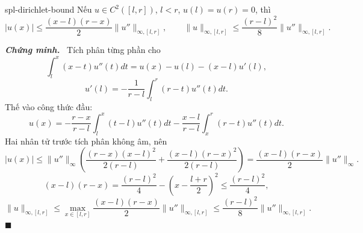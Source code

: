 \documentclass[12pt,a4paper,oneside]{book}
\numberwithin{algorithm}{chapter}
\theoremstyle{definition}
\newenvironment{chungminh}{\par\medskip\noindent\textbf{\textit{\color{mainblue}Chứng minh.}}\ }{\hfill$\blacksquare$\par\medskip}
\begin{document}
\begin{bode}{}{spl-dirichlet-bound}
Nếu $u\in C^2([l,r])$, $l<r$, $u(l)=u(r)=0$, thì
\[
 |u(x)|\leq\frac{(x-l)(r-x)}2\|u''\|_{\infty,[l,r]},\qquad
 \|u\|_{\infty,[l,r]}\leq\frac{(r-l)^2}8\|u''\|_{\infty,[l,r]}.
\]
\end{bode}
\begin{chungminh}
Tích phân từng phần cho
\[
 \int_l^x(x-t)u''(t)dt=u(x)-u(l)-(x-l)u'(l),
\]
\[
 u'(l)=-\frac1{r-l}\int_l^r(r-t)u''(t)dt.
\]
Thế vào công thức đầu:
\[
 u(x)=-\frac{r-x}{r-l}\int_l^x(t-l)u''(t)dt
      -\frac{x-l}{r-l}\int_x^r(r-t)u''(t)dt.
\]
Hai nhân tử trước tích phân không âm, nên
\[
 |u(x)|\leq\|u''\|_\infty\left(\frac{(r-x)(x-l)^2}{2(r-l)}+
 \frac{(x-l)(r-x)^2}{2(r-l)}\right)
 =\frac{(x-l)(r-x)}2\|u''\|_\infty.
\]
\[
 (x-l)(r-x)
 =\frac{(r-l)^2}4-\left(x-\frac{l+r}2\right)^2
 \leq\frac{(r-l)^2}4,
\]
\[
 \|u\|_{\infty,[l,r]}
 \leq\max_{x\in[l,r]}\frac{(x-l)(r-x)}2\|u''\|_{\infty,[l,r]}
 \leq\frac{(r-l)^2}8\|u''\|_{\infty,[l,r]}.
\]
\end{chungminh}
\end{document}

